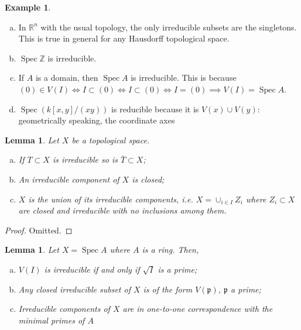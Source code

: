 \documentclass{article}
\newcommand{\R}{\mathbb{R}}
\newcommand{\Z}{\mathbb{Z}}
\newcommand{\fr}{\mathfrak}
\DeclareMathOperator{\Spec}{Spec}
\theoremstyle{plain}
\newtheorem{lem}[thm]{Lemma}
\theoremstyle{definition}
\newtheorem{exmp}{Example}
\theoremstyle{remark}
\begin{document}
\begin{exmp}\hspace{1mm}
\begin{enumerate}[(a)]
\item In $\R^n$ with the usual topology, the only irreducible subsets are the singletons. This is true in general for any Hausdorff topological space.
\item $\Spec\Z$ is irreducible.
\item If $A$ is a domain, then $\Spec A$ is irreducible. This is because $(0)\in V(I)\iff I\subset(0)\iff I\subset(0)\iff I=(0)\implies V(I)=\Spec A$.
\item $\Spec(k[x,y]/(xy))$ is reducible because it is $V(x)\cup V(y)$: geometrically speaking, the coordinate axes
\end{enumerate}
\end{exmp}

\begin{lem}
\label{L24}
Let $X$ be a topological space.
\begin{enumerate}[(a)]
\item If $T\subset X$ is irreducible so is $\bar T\subset X$;
\item An irreducible component of $X$ is closed;
\item $X$ is the union of its irreducible components, i.e. $X=\cup_{i\in I}Z_i$ where $Z_i\subset X$ are closed and irreducible with no inclusions among them. 
\end{enumerate}
\end{lem}
\begin{proof}
Omitted.
\end{proof}

\begin{lem}
\label{L25}
Let $X=\Spec A$ where $A$ is a ring. Then,
\begin{enumerate}[(a)]
\item $V(I)$ is irreducible if and only if $\sqrt{I}$ is a prime;
\item Any closed irreducible subset of $X$ is of the form $V(\fr p)$, $\fr p$ a prime;
\item Irreducible components of $X$ are in one-to-one correspondence with the minimal primes of $A$
\end{enumerate}
\end{lem}
\end{document}
